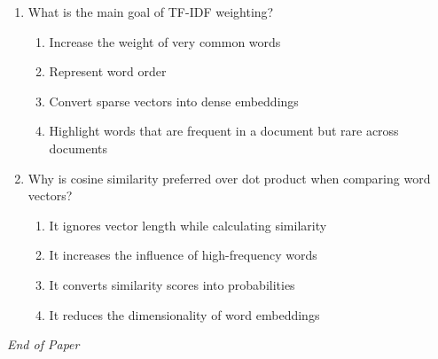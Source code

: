 \documentclass[12pt]{article}
\begin{document}
\begin{enumerate}[label=Q\arabic*.]
\begin{enumerate}[label=(\Alph*)]
    \item Only when the prediction is correct
    \item Only when the prediction is incorrect
    \item Only after one full pass over the data
\end{enumerate}
\item What is the main goal of TF-IDF weighting?
\begin{enumerate}[label=(\Alph*)]
    \item Increase the weight of very common words
    \item Represent word order
    \item Convert sparse vectors into dense embeddings
    \item Highlight words that are frequent in a document but rare across documents
\end{enumerate}
\item Why is cosine similarity preferred over dot product when comparing word vectors?
\begin{enumerate}[label=(\Alph*)]
    \item It ignores vector length while calculating similarity
    \item It increases the influence of high-frequency words
    \item It converts similarity scores into probabilities
    \item It reduces the dimensionality of word embeddings
\end{enumerate}
\end{enumerate}

\vfill
\noindent\textit{End of Paper}
\end{document}
